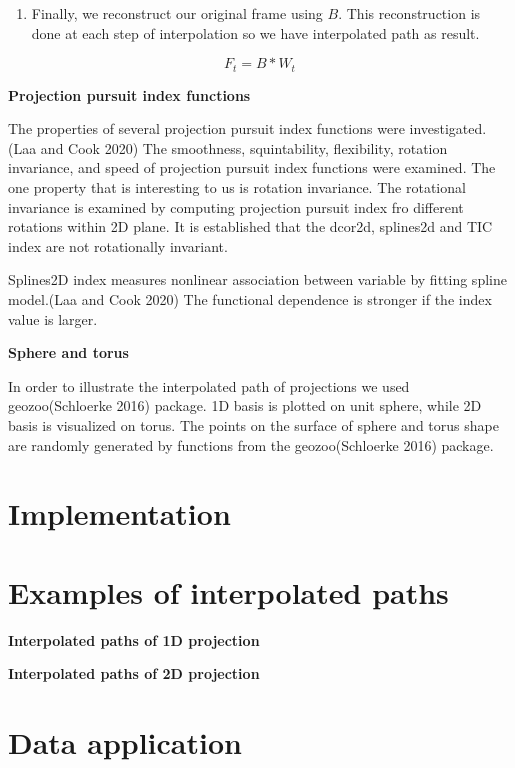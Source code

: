 \begin{enumerate}
\def\labelenumi{\arabic{enumi}.}
\setcounter{enumi}{4}
\tightlist
\item
  Finally, we reconstruct our original frame using \(B\). This reconstruction is done at each step of interpolation so we have interpolated path as result.
\end{enumerate}

\[F_t = B * W_t\]

\textbf{Projection pursuit index functions}

The properties of several projection pursuit index functions were investigated.(Laa and Cook 2020) The smoothness, squintability, flexibility, rotation invariance, and speed of projection pursuit index functions were examined. The one property that is interesting to us is rotation invariance. The rotational invariance is examined by computing projection pursuit index fro different rotations within 2D plane. It is established that the dcor2d, splines2d and TIC index are not rotationally invariant.

Splines2D index measures nonlinear association between variable by fitting spline model.(Laa and Cook 2020) The functional dependence is stronger if the index value is larger.

\textbf{Sphere and torus}

In order to illustrate the interpolated path of projections we used geozoo(Schloerke 2016) package. 1D basis is plotted on unit sphere, while 2D basis is visualized on torus. The points on the surface of sphere and torus shape are randomly generated by functions from the geozoo(Schloerke 2016) package.

\hypertarget{implementation}{%
\section{Implementation}\label{implementation}}

\hypertarget{examples-of-interpolated-paths}{%
\section{Examples of interpolated paths}\label{examples-of-interpolated-paths}}

\textbf{Interpolated paths of 1D projection}

\textbf{Interpolated paths of 2D projection}

\hypertarget{data-application}{%
\section{Data application}\label{data-application}}

